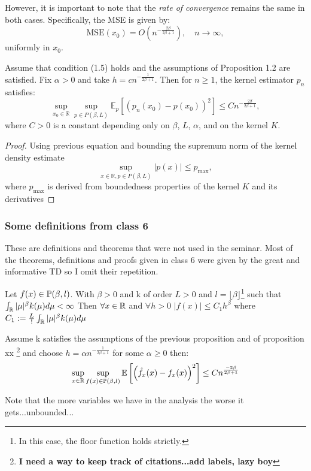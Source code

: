 \documentclass{article}
\begin{document}
However, it is important to note that the \textit{rate of convergence} remains the same in both cases. Specifically, the MSE is given by:
\[
    \text{MSE}(x_0) = O\left(n^{-\frac{2\beta}{2\beta+1}}\right), \quad n \to \infty,
\]
uniformly in \( x_0 \).
\begin{theorem}
    Assume that condition (1.5) holds and the assumptions of Proposition 1.2 are satisfied. Fix $\alpha > 0$ and take $h = cn^{-\frac{1}{2\beta+1}}$. Then for $n \geq 1$, the kernel estimator $p_n$ satisfies:
    \[
        \sup_{x_0 \in \mathbb{R}} \sup_{p \in P(\beta, L)} \mathbb{E}_p\left[(p_n(x_0) - p(x_0))^2\right] \leq C n^{-\frac{2\beta}{2\beta+1}},
    \]
    where $C > 0$ is a constant depending only on $\beta$, $L$, $\alpha$, and on the kernel $K$.
\end{theorem}

\begin{proof} Using previous equation and bounding the supremum norm of the kernel density estimate
    \[
    \sup_{x \in \mathbb{R}, p \in P(\beta, L)} |p(x)| \leq p_{\max},
\]
where $p_{\max}$ is derived from boundedness properties of the kernel $K$ and its derivatives
\end{proof}


\subsubsection{Some definitions from class 6}
These are definitions and theorems that were not used in the seminar. Most of the theorems, definitions and proofs given in class 6 were given by the great and informative TD so I omit their repetition. 
\begin{proposition}
    Let \(f(x)\in \mathbb{P}(\beta, l)\). With \(\beta>0\) and k of order \(L>0\) and \(l=\lfloor \beta \rfloor\)\footnote{In this case, the floor function holds strictly.} such that \(\int_{\mathbb{R}}|\mu|^{\beta} k(\mu) d\mu <\infty\) Then \(\forall x \in \mathbb{R}\) and \(\forall h>0\) \(|f(x)|\leq C_{1}h^{\beta}\) where \(C_{1}:=\frac{L}{!}\int_{\mathbb{R}}|\mu|^{\beta} k(\mu) d\mu\)
\end{proposition}

\begin{theorem}
    Assume k satisfies the assumptions of the previous proposition and of proposition xx \footnote{\textbf{I need a way to keep track of citations...add labels, lazy boy}} and choose \(h=\alpha n^{-\frac{1}{2\beta + 1}}\) for some \(\alpha \geq 0\) then: 
    \[
        \sup_{x \in \mathbb{R}} \sup_{f(x) \in \mathbb{P}(\beta , l)} \mathbb{E} \left[ \left(\hat{f}_{x}(x)-f_{x}(x)\right)^{2}\right] \leq C n^{\frac{-2\beta}{2\beta+1}} \]

    
\end{theorem}
Note that the more variables we have in the analysis the  worse it gets...unbounded...
\end{document}
